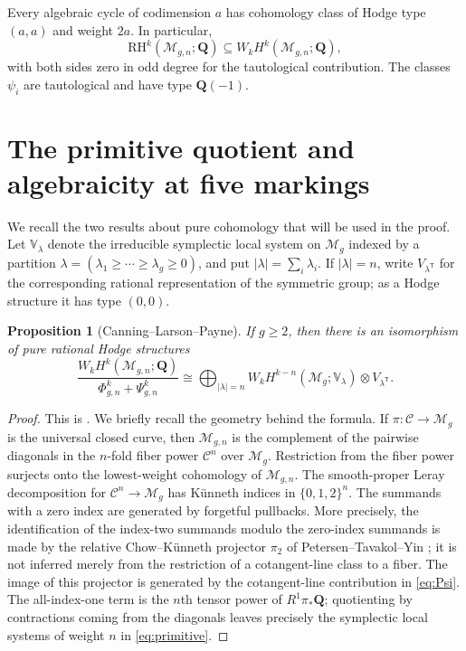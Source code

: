 \documentclass[11pt,reqno]{amsart}
\newcommand{\Q}{\mathbf{Q}}
\newcommand{\M}{\mathcal{M}}
\newcommand{\RH}{\mathrm{RH}}
\newtheorem{proposition}[theorem]{Proposition}
\theoremstyle{definition}
\theoremstyle{remark}
\begin{document}
Every algebraic cycle of codimension $a$ has cohomology class of Hodge type
$(a,a)$ and weight $2a$.  In particular,
\[
  \RH^k(\M_{g,n};\Q)\subseteq W_kH^k(\M_{g,n};\Q),
\]
with both sides zero in odd degree for the tautological contribution.  The
classes $\psi_i$ are tautological and have type $\Q(-1)$.

\section{The primitive quotient and algebraicity at five markings}

We recall the two results about pure cohomology that will be used in the
proof.  Let $\mathbb V_\lambda$ denote the irreducible symplectic local system
on $\M_g$ indexed by a partition
$\lambda=(\lambda_1\geq\cdots\geq\lambda_g\geq0)$, and put
$|\lambda|=\sum_i\lambda_i$.  If $|\lambda|=n$, write
$V_{\lambda^{\mathsf T}}$ for the corresponding rational representation of
the symmetric group; as a Hodge structure it has type $(0,0)$.

\begin{proposition}[Canning--Larson--Payne]\label{prop:primitive}
If $g\geq2$, then there is an isomorphism of pure rational Hodge structures
\begin{equation}\label{eq:primitive}
 \frac{W_kH^k(\M_{g,n};\Q)}{\Phi^k_{g,n}+\Psi^k_{g,n}}
 \cong
 \bigoplus_{|\lambda|=n}
 W_kH^{k-n}(\M_g;\mathbb V_\lambda)
 \otimes V_{\lambda^{\mathsf T}}.
\end{equation}
\end{proposition}

\begin{proof}
This is \cite[Lemma~3.1(a)]{CanningLarsonPayne}.  We briefly recall the
geometry behind the formula.  If $\pi\colon\mathcal C\to\M_g$ is the universal
closed curve, then $\M_{g,n}$ is the complement of the pairwise diagonals in
the $n$-fold fiber power $\mathcal C^n$ over $\M_g$.  Restriction from the
fiber power surjects onto the lowest-weight cohomology of $\M_{g,n}$.  The
smooth-proper Leray decomposition for $\mathcal C^n\to\M_g$ has K\"unneth
indices in $\{0,1,2\}^n$.  The summands with a zero index are generated by
forgetful pullbacks.  More precisely, the identification of the index-two
summands modulo the zero-index summands is made by the relative
Chow--K\"unneth projector $\pi_2$ of Petersen--Tavakol--Yin
\cite[Sections~5.1 and 5.2.2]{PetersenTavakolYin}; it is not inferred merely
from the restriction of a cotangent-line class to a fiber.  The image of this
projector is generated by the cotangent-line contribution in
\eqref{eq:Psi}.  The all-index-one term is the $n$th tensor power of
$R^1\pi_*\Q$; quotienting by contractions coming from the diagonals leaves
precisely the symplectic local systems of weight $n$ in
\eqref{eq:primitive}.
\end{proof}
\end{document}
